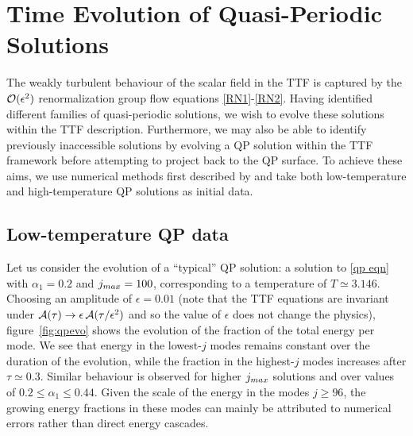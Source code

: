 \documentclass[../PhD.tex]{subfiles}
\begin{document}

\section{Time Evolution of Quasi-Periodic Solutions}
\label{sec: time evolution}

The weakly turbulent behaviour of the scalar field in the TTF is captured by the $\mathcal O(\epsilon^2)$ renormalization group flow equations {\eqref{RN1}-\eqref{RN2}}. Having identified different families of quasi-periodic solutions, we wish to evolve these solutions within the TTF description. Furthermore, we may also be able to identify previously inaccessible solutions by evolving a QP solution within the TTF framework before attempting to project back to the QP surface. To achieve these aims, we use numerical methods first described by \cite{1606.02712} and take both low-temperature and high-temperature QP solutions as initial data. 


\subsection{Low-temperature QP data}

Let us consider the evolution of a ``typical'' QP solution: a solution to \eqref{qp eqn} with $\alpha_1 = 0.2$ and $j_{max} = 100$, corresponding to a temperature of $T \simeq 3.146$. Choosing an amplitude of $\epsilon = 0.01$ (note that the TTF equations are invariant under $\mathcal A(\tau) \to \epsilon \, \mathcal A(\tau / \epsilon^2)$ and so the value of $\epsilon$ does not change the physics), figure~\ref{fig:qpevo} shows the evolution of the fraction of the total energy per mode. We see that energy in the lowest-$j$ modes remains constant over the duration of the evolution, while the fraction in the highest-$j$ modes increases after $\tau \simeq 0.3$. Similar behaviour is observed for higher $j_{max}$ solutions and over values of $0.2 \leq \alpha_1 \leq 0.44$. Given the scale of the energy in the modes $j \geq 96$, the growing energy fractions in these modes can mainly be attributed to numerical errors rather than direct energy cascades.
\end{document}
